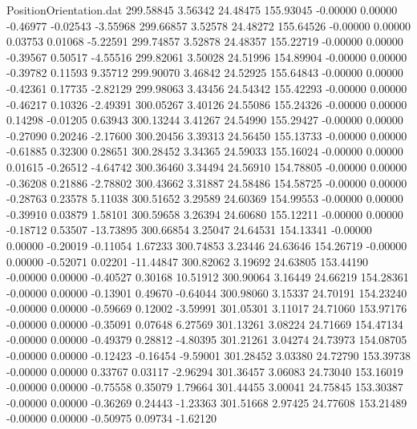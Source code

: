 \begin{filecontents}{PositionOrientation.dat}
 299.58845    3.56342   24.48475   155.93045   -0.00000    0.00000   -0.46977   -0.02543   -3.55968
 299.66857    3.52578   24.48272   155.64526   -0.00000    0.00000    0.03753    0.01068   -5.22591
 299.74857    3.52878   24.48357   155.22719   -0.00000    0.00000   -0.39567    0.50517   -4.55516
 299.82061    3.50028   24.51996   154.89904   -0.00000    0.00000   -0.39782    0.11593    9.35712
 299.90070    3.46842   24.52925   155.64843   -0.00000    0.00000   -0.42361    0.17735   -2.82129
 299.98063    3.43456   24.54342   155.42293   -0.00000    0.00000   -0.46217    0.10326   -2.49391
 300.05267    3.40126   24.55086   155.24326   -0.00000    0.00000    0.14298   -0.01205    0.63943
 300.13244    3.41267   24.54990   155.29427   -0.00000    0.00000   -0.27090    0.20246   -2.17600
 300.20456    3.39313   24.56450   155.13733   -0.00000    0.00000   -0.61885    0.32300    0.28651
 300.28452    3.34365   24.59033   155.16024   -0.00000    0.00000    0.01615   -0.26512   -4.64742
 300.36460    3.34494   24.56910   154.78805   -0.00000    0.00000   -0.36208    0.21886   -2.78802
 300.43662    3.31887   24.58486   154.58725   -0.00000    0.00000   -0.28763    0.23578    5.11038
 300.51652    3.29589   24.60369   154.99553   -0.00000    0.00000   -0.39910    0.03879    1.58101
 300.59658    3.26394   24.60680   155.12211   -0.00000    0.00000   -0.18712    0.53507  -13.73895
 300.66854    3.25047   24.64531   154.13341   -0.00000    0.00000   -0.20019   -0.11054    1.67233
 300.74853    3.23446   24.63646   154.26719   -0.00000    0.00000   -0.52071    0.02201  -11.44847
 300.82062    3.19692   24.63805   153.44190   -0.00000    0.00000   -0.40527    0.30168   10.51912
 300.90064    3.16449   24.66219   154.28361   -0.00000    0.00000   -0.13901    0.49670   -0.64044
 300.98060    3.15337   24.70191   154.23240   -0.00000    0.00000   -0.59669    0.12002   -3.59991
 301.05301    3.11017   24.71060   153.97176   -0.00000    0.00000   -0.35091    0.07648    6.27569
 301.13261    3.08224   24.71669   154.47134   -0.00000    0.00000   -0.49379    0.28812   -4.80395
 301.21261    3.04274   24.73973   154.08705   -0.00000    0.00000   -0.12423   -0.16454   -9.59001
 301.28452    3.03380   24.72790   153.39738   -0.00000    0.00000    0.33767    0.03117   -2.96294
 301.36457    3.06083   24.73040   153.16019   -0.00000    0.00000   -0.75558    0.35079    1.79664
 301.44455    3.00041   24.75845   153.30387   -0.00000    0.00000   -0.36269    0.24443   -1.23363
 301.51668    2.97425   24.77608   153.21489   -0.00000    0.00000   -0.50975    0.09734   -1.62120

\end{filecontents}
